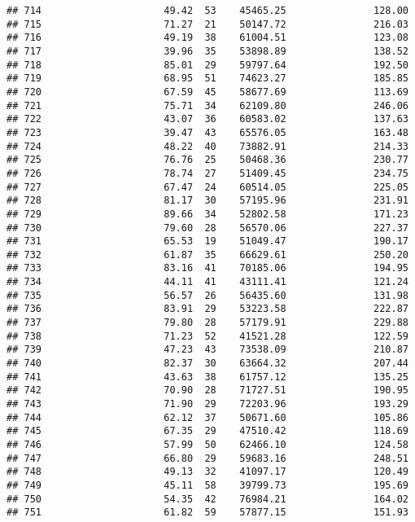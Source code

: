 \documentclass[
]{article}
\begin{document}
\begin{verbatim}
## 714                     49.42  53    45465.25               128.00
## 715                     71.27  21    50147.72               216.03
## 716                     49.19  38    61004.51               123.08
## 717                     39.96  35    53898.89               138.52
## 718                     85.01  29    59797.64               192.50
## 719                     68.95  51    74623.27               185.85
## 720                     67.59  45    58677.69               113.69
## 721                     75.71  34    62109.80               246.06
## 722                     43.07  36    60583.02               137.63
## 723                     39.47  43    65576.05               163.48
## 724                     48.22  40    73882.91               214.33
## 725                     76.76  25    50468.36               230.77
## 726                     78.74  27    51409.45               234.75
## 727                     67.47  24    60514.05               225.05
## 728                     81.17  30    57195.96               231.91
## 729                     89.66  34    52802.58               171.23
## 730                     79.60  28    56570.06               227.37
## 731                     65.53  19    51049.47               190.17
## 732                     61.87  35    66629.61               250.20
## 733                     83.16  41    70185.06               194.95
## 734                     44.11  41    43111.41               121.24
## 735                     56.57  26    56435.60               131.98
## 736                     83.91  29    53223.58               222.87
## 737                     79.80  28    57179.91               229.88
## 738                     71.23  52    41521.28               122.59
## 739                     47.23  43    73538.09               210.87
## 740                     82.37  30    63664.32               207.44
## 741                     43.63  38    61757.12               135.25
## 742                     70.90  28    71727.51               190.95
## 743                     71.90  29    72203.96               193.29
## 744                     62.12  37    50671.60               105.86
## 745                     67.35  29    47510.42               118.69
## 746                     57.99  50    62466.10               124.58
## 747                     66.80  29    59683.16               248.51
## 748                     49.13  32    41097.17               120.49
## 749                     45.11  58    39799.73               195.69
## 750                     54.35  42    76984.21               164.02
## 751                     61.82  59    57877.15               151.93

\end{verbatim}
\end{document}
